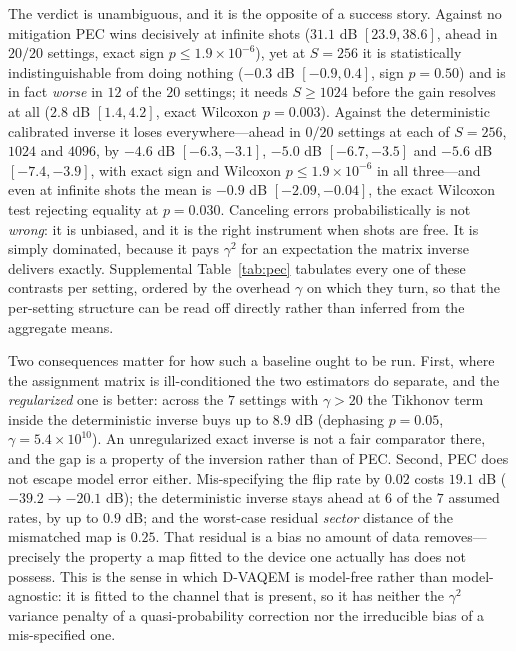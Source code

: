 \documentclass[ASNA,twocolumn]{USG}
\newcommand{\dvaqem}{D-VAQEM}
\begin{document}
The verdict is unambiguous, and it is the opposite of a success story.  Against
no mitigation PEC wins decisively at infinite shots ($31.1$ dB $[23.9,38.6]$,
ahead in $20/20$ settings, exact sign $p\le1.9\times10^{-6}$), yet at $S=256$ it
is statistically indistinguishable from doing nothing ($-0.3$ dB $[-0.9,0.4]$,
sign $p=0.50$) and is in fact \emph{worse} in $12$ of the $20$ settings; it needs
$S\ge1024$ before the gain resolves at all ($2.8$ dB $[1.4,4.2]$, exact
Wilcoxon $p=0.003$).  Against the deterministic calibrated inverse it loses
everywhere---ahead in $0/20$ settings at each of $S=256$, $1024$ and $4096$, by
$-4.6$ dB $[-6.3,-3.1]$, $-5.0$ dB $[-6.7,-3.5]$ and $-5.6$ dB $[-7.4,-3.9]$,
with exact sign and Wilcoxon $p\le1.9\times10^{-6}$ in all three---and even at
infinite shots the mean is $-0.9$ dB $[-2.09,-0.04]$, the exact Wilcoxon test
rejecting equality at $p=0.030$.  Canceling errors probabilistically is not
\emph{wrong}: it is unbiased, and it is the right instrument when shots are
free.  It is simply dominated, because it pays $\gamma^2$ for an expectation the
matrix inverse delivers exactly.  Supplemental Table~\ref{tab:pec} tabulates
every one of these contrasts per setting, ordered by the overhead $\gamma$ on
which they turn, so that the per-setting structure can be read off directly
rather than inferred from the aggregate means.

Two consequences matter for how such a baseline ought to be run.  First, where
the assignment matrix is ill-conditioned the two estimators do separate, and the
\emph{regularized} one is better: across the $7$ settings with $\gamma>20$ the
Tikhonov term inside the deterministic inverse buys up to $8.9$ dB (dephasing
$p=0.05$, $\gamma=5.4\times10^{10}$).  An unregularized exact inverse is not a
fair comparator there, and the gap is a property of the inversion rather than of
PEC.  Second, PEC does not escape model error either.  Mis-specifying the flip
rate by $0.02$ costs $19.1$ dB ($-39.2\to-20.1$ dB); the deterministic inverse
stays ahead at $6$ of the $7$ assumed rates, by up to $0.9$ dB; and the
worst-case residual \emph{sector} distance of the mismatched map is $0.25$.
That residual is a bias no amount of data removes---precisely the property a map
fitted to the device one actually has does not possess.  This is the sense in
which \dvaqem{} is model-free rather than model-agnostic: it is fitted to the
channel that is present, so it has neither the $\gamma^2$ variance penalty of a
quasi-probability correction nor the irreducible bias of a mis-specified one.
\end{document}
